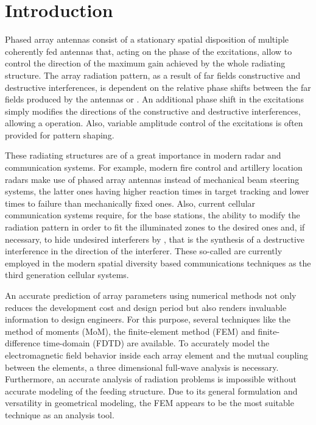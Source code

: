 \cleardoublepage
\renewcommand\thefigure{\arabic{figure}}
\pagestyle{myheadings}

{}
\chapter*{Introduction}

\par Phased array antennas consist of a stationary spatial disposition of multiple coherently fed antennas that, acting on the phase of the excitations, allow to control the direction of the maximum gain achieved by the whole radiating structure. The array radiation pattern, as a result of far fields constructive and destructive interferences, is dependent on the relative phase shifts between the far fields produced by the antennas or . An additional phase shift in the excitations simply modifies the directions of the constructive and destructive interferences, allowing a  operation. Also, variable amplitude control of the excitations is often provided for pattern shaping. \cite{BalanisAT, StutzmanThieleATD, MilliganMAD, SelleriETA, MaillouxPAAH}

\par These radiating structures are of a great importance in modern radar and communication systems. For example, modern fire control and artillery location radars make use of phased array antennas instead of mechanical beam steering systems, the latter ones having higher reaction times in target tracking and lower times to failure than mechanically fixed ones. Also, current cellular communication systems require, for the base stations, the ability to modify the radiation pattern in order to fit the illuminated zones to the desired ones and, if necessary, to hide undesired interferers by , that is the synthesis of a destructive interference in the direction of the interferer. These so-called  \cite{ZooghbySAE} are currently employed in the modern spatial diversity based communications techniques as the third generation cellular systems.

\par An accurate prediction of array parameters using numerical methods not only reduces the development cost and design period but also renders invaluable information to design engineers. For this purpose, several techniques like the method of moments (MoM), the finite-element method (FEM) and finite-difference time-domain (FDTD) are available. To accurately model the electromagnetic field behavior inside each array element and the mutual coupling between the elements, a three dimensional full-wave analysis is necessary. Furthermore, an accurate analysis of radiation problems is impossible without accurate modeling of the feeding structure. Due to its general formulation and versatility in geometrical modeling, the FEM appears to be the most suitable technique as an analysis tool. 

